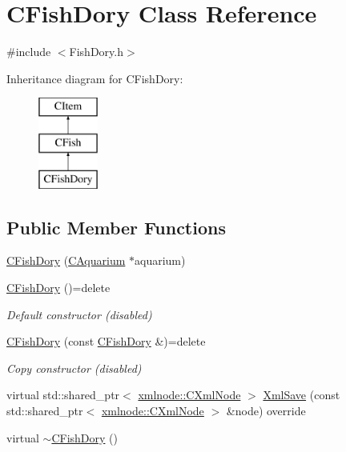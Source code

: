\hypertarget{class_c_fish_dory}{}\section{C\+Fish\+Dory Class Reference}
\label{class_c_fish_dory}


{\ttfamily \#include $<$Fish\+Dory.\+h$>$}

Inheritance diagram for C\+Fish\+Dory\+:\begin{figure}[H]
\begin{center}
\leavevmode
\includegraphics[height=3.000000cm]{class_c_fish_dory}
\end{center}
\end{figure}
\subsection*{Public Member Functions}
\begin{DoxyCompactItemize}
\item 
\mbox{\hyperlink{class_c_fish_dory_a7ed7364e99765e9424fc30e8de6124d9}{C\+Fish\+Dory}} (\mbox{\hyperlink{class_c_aquarium}{C\+Aquarium}} $\ast$aquarium)
\item 
\mbox{\label{class_c_fish_dory_a4be4a33a09b36bbf4a5d5a9fa2130d99}} 
\mbox{\hyperlink{class_c_fish_dory_a4be4a33a09b36bbf4a5d5a9fa2130d99}{C\+Fish\+Dory}} ()=delete
\begin{DoxyCompactList}\small\item\em Default constructor (disabled) \end{DoxyCompactList}\item 
\mbox{\label{class_c_fish_dory_a5db32b267a3553013bd9c15620a88b24}} 
\mbox{\hyperlink{class_c_fish_dory_a5db32b267a3553013bd9c15620a88b24}{C\+Fish\+Dory}} (const \mbox{\hyperlink{class_c_fish_dory}{C\+Fish\+Dory}} \&)=delete
\begin{DoxyCompactList}\small\item\em Copy constructor (disabled) \end{DoxyCompactList}\item 
virtual std\+::shared\+\_\+ptr$<$ \mbox{\hyperlink{classxmlnode_1_1_c_xml_node}{xmlnode\+::\+C\+Xml\+Node}} $>$ \mbox{\hyperlink{class_c_fish_dory_ac906b7f952cdbc52a72d1e87c9228ad9}{Xml\+Save}} (const std\+::shared\+\_\+ptr$<$ \mbox{\hyperlink{classxmlnode_1_1_c_xml_node}{xmlnode\+::\+C\+Xml\+Node}} $>$ \&node) override
\item 
virtual \mbox{\hyperlink{class_c_fish_dory_abe5cd45721286d8a67aacbe5e3cdc580}{$\sim$\+C\+Fish\+Dory}} ()
\end{DoxyCompactItemize}
